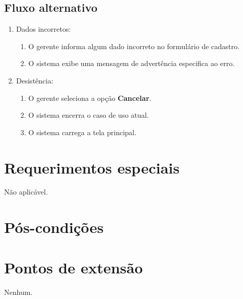 \subsection{Fluxo alternativo}

\begin{enumerate}
	\item Dados incorretos:
	\begin{enumerate}
		\item O gerente informa algum dado incorreto no formulário de cadastro. 
		\item O sistema exibe uma mensagem de advertência especifica ao erro.
	\end{enumerate}	
	\item Desistência:
	\begin{enumerate}
		\item O gerente seleciona a opção \textbf{Cancelar}.
		\item O sistema encerra o caso de uso atual.
		\item O sistema carrega a tela principal.
	\end{enumerate}
\end{enumerate}

\section{Requerimentos especiais}

Não aplicável.

\section{Pós-condições}

\section{Pontos de extensão}

Nenhum.